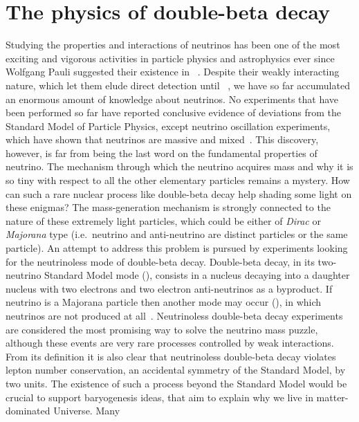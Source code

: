 
\chapter{The physics of double-beta decay}\label{chap:theory}

Studying the properties and interactions of neutrinos has been one of the most exciting
and vigorous activities in particle physics and astrophysics ever since Wolfgang Pauli
suggested their existence in ~\cite{Brown1978}. Despite their weakly interacting
nature, which let them elude direct detection until ~\cite{Cowan1956},
we have so far accumulated an enormous amount of knowledge about neutrinos. No experiments
that have been performed so far have reported conclusive evidence of deviations from the
Standard Model of Particle Physics, except neutrino oscillation experiments, which have
shown that neutrinos are massive and mixed~\cite{Fukuda1998, Ahmad2002, Eguchi2003,
Kajita2016, McDonald2016}.  This discovery, however, is far from being the last word on
the fundamental properties of neutrino. The mechanism through which the neutrino acquires
mass and why it is so tiny with respect to all the other elementary particles remains a
mystery. How can such a rare nuclear process like double-beta decay help shading some
light on these enigmas?
\newpar
The mass-generation mechanism is strongly connected to the nature of these extremely light
particles, which could be either of \emph{Dirac} or \emph{Majorana} type (i.e.~neutrino and
anti-neutrino are distinct particles or the same particle). An attempt to address this
problem is pursued by experiments looking for the neutrinoless mode of double-beta decay.
Double-beta decay, in its two-neutrino Standard Model mode (\nnbb), consists in a
nucleus decaying into a daughter nucleus with two electrons and two electron
anti-neutrinos as a byproduct. If neutrino is a Majorana particle then another mode
may occur (\onbb), in which neutrinos are not produced at all~\cite{Schechter1982}.
Neutrinoless double-beta decay experiments are considered the most promising way to solve
the neutrino mass puzzle, although these events are very rare processes controlled by weak
interactions.
\newpar
From its definition it is also clear that neutrinoless double-beta decay violates lepton
number conservation, an accidental symmetry of the Standard Model, by two units. The
existence of such a process beyond the Standard Model would be crucial to support
baryogenesis ideas, that aim to explain why we live in matter-dominated Universe.  Many
